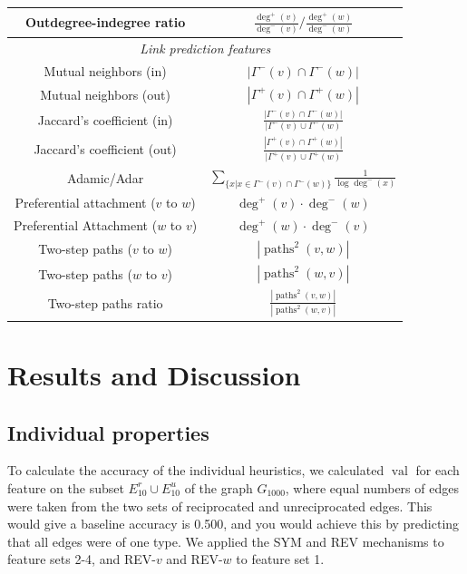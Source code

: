 \documentclass[conference]{IEEEtran}
\begin{document}
\begin{table}[!t]
\begin{tabular}{|c||c|}
\hline
Outdegree-indegree ratio & $\frac{\deg^+(v)}{\deg^-(v)} / \frac{\deg^+(w)}{\deg^-(w)} $ \\
\hline
\multicolumn{2}{|c|}{\emph{Link prediction features}} \\
\hline
Mutual neighbors (in) & $|\Gamma^-(v) \cap \Gamma^-(w)|$ \\
Mutual neighbors (out) & $|\Gamma^+(v) \cap \Gamma^+(w)|$ \\
\hline
Jaccard's coefficient (in) & $\frac{|\Gamma^-(v) \cap \Gamma^-(w)|}{|\Gamma^-(v) \cup \Gamma^-(w)}$ \\
Jaccard's coefficient (out) & $\frac{|\Gamma^+(v) \cap \Gamma^+(w)|}{|\Gamma^+(v) \cup \Gamma^+(w)}$ \\
\hline
Adamic/Adar & $\sum_{\{x|x \in \Gamma^-(v) \cap \Gamma^-(w)\}} \frac{1}{\log{\deg^-(x)}}$ \\
\hline
Preferential attachment ($v$ to $w$) & $\deg^+(v)\cdot \deg^-(w)$ \\
Preferential Attachment ($w$ to $v$) & $\deg^+(w)\cdot \deg^-(v)$ \\
\hline
Two-step paths ($v$ to $w$) & $ |\operatorname{paths}^2(v,w)|$ \\
Two-step paths ($w$ to $v$) & $ |\operatorname{paths}^2(w,v)|$ \\
\hline
Two-step paths ratio & $\frac{|\operatorname{paths}^2(v,w)|}{|\operatorname{paths}^2(w,v)|}$ \\
\hline
\end{tabular}
\end{table}

\section{Results and Discussion}

\subsection{Individual properties}
To calculate the accuracy of the individual heuristics, we calculated $\operatorname{val}$ for each feature on the subset $E_{10}^r \cup E_{10}^u$ of the graph $G_{1000}$, where equal numbers of edges were taken from the two sets of reciprocated and unreciprocated edges. 
This would give a baseline accuracy is 0.500, and you would achieve this by predicting that all edges were of one type. 
We applied the SYM and REV mechanisms to feature sets 2-4, and REV-$v$ and REV-$w$ to feature set 1.
\end{document}
